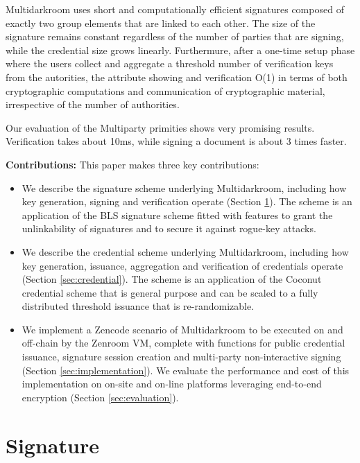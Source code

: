 \documentclass[twocolumn]{article}
\begin{document}
Multidarkroom uses short and computationally efficient signatures
composed of exactly two group elements that are linked to each
other. The size of the signature remains constant regardless of the
number of parties that are signing, while the credential size grows
linearly. Furthermure, after a one-time setup phase where the users
collect and aggregate a threshold number of verification keys from the
autorities, the attribute showing and verification O(1) in terms of
both cryptographic computations and communication of cryptographic
material, irrespective of the number of authorities.

Our evaluation of the Multiparty primities shows very promising
results. Verification takes about 10ms, while signing a document is
about 3 times faster.

\textbf{Contributions:} This paper makes three key contributions:

\begin{itemize}

\item We describe the signature scheme underlying Multidarkroom,
  including how key generation, signing and verification operate
  (Section \ref{sec:signature}). The scheme is an application of the
  BLS signature scheme \citep{asiacrypt-bls} fitted with features to
  grant the unlinkability of signatures and to secure it against
  rogue-key attacks.

\item We describe the credential scheme underlying Multidarkroom,
  including how key generation, issuance, aggregation and verification
  of credentials operate (Section \ref{sec:credential}). The scheme is
  an application of the Coconut credential scheme \citep{coconut-2018}
  that is general purpose and can be scaled to a fully distributed
  threshold issuance that is re-randomizable.

\item We implement a Zencode scenario of Multidarkroom to be executed
  on and off-chain by the Zenroom VM, complete with functions for
  public credential issuance, signature session creation and
  multi-party non-interactive signing (Section
  \ref{sec:implementation}). We evaluate the performance and cost of
  this implementation on on-site and on-line platforms leveraging
  end-to-end encryption (Section \ref{sec:evaluation}).

\end{itemize}

\section{Signature}
\label{sec:signature}
\end{document}
